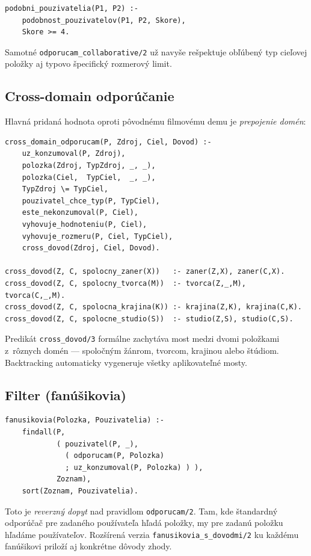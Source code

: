 \documentclass[11pt,a4paper]{article}
\begin{document}
\begin{lstlisting}
podobni_pouzivatelia(P1, P2) :-
    podobnost_pouzivatelov(P1, P2, Skore),
    Skore >= 4.
\end{lstlisting}

\noindent
Samotné \texttt{odporucam\_collaborative/2} už navyše rešpektuje
obľúbený typ cieľovej položky aj typovo špecifický rozmerový limit.

\subsection{Cross-domain odporúčanie}

Hlavná pridaná hodnota oproti pôvodnému filmovému demu je
\emph{prepojenie domén}:

\begin{lstlisting}
cross_domain_odporucam(P, Zdroj, Ciel, Dovod) :-
    uz_konzumoval(P, Zdroj),
    polozka(Zdroj, TypZdroj, _, _),
    polozka(Ciel,  TypCiel,  _, _),
    TypZdroj \= TypCiel,
    pouzivatel_chce_typ(P, TypCiel),
    este_nekonzumoval(P, Ciel),
    vyhovuje_hodnoteniu(P, Ciel),
    vyhovuje_rozmeru(P, Ciel, TypCiel),
    cross_dovod(Zdroj, Ciel, Dovod).

cross_dovod(Z, C, spolocny_zaner(X))   :- zaner(Z,X), zaner(C,X).
cross_dovod(Z, C, spolocny_tvorca(M))  :- tvorca(Z,_,M), tvorca(C,_,M).
cross_dovod(Z, C, spolocna_krajina(K)) :- krajina(Z,K), krajina(C,K).
cross_dovod(Z, C, spolocne_studio(S))  :- studio(Z,S), studio(C,S).
\end{lstlisting}

\noindent
Predikát \texttt{cross\_dovod/3} formálne zachytáva most medzi
dvomi položkami z~rôznych domén --- spoločným žánrom, tvorcom,
krajinou alebo štúdiom. Backtracking automaticky vygeneruje
všetky aplikovateľné mosty.

\subsection{Filter  (fanúšikovia)}

\begin{lstlisting}
fanusikovia(Polozka, Pouzivatelia) :-
    findall(P,
            ( pouzivatel(P, _),
              ( odporucam(P, Polozka)
              ; uz_konzumoval(P, Polozka) ) ),
            Zoznam),
    sort(Zoznam, Pouzivatelia).
\end{lstlisting}

\noindent
Toto je \emph{reverzný dopyt} nad pravidlom \texttt{odporucam/2}.
Tam, kde štandardný odporúčač pre zadaného používateľa hľadá
položky, my pre zadanú položku hľadáme používateľov.
Rozšírená verzia \texttt{fanusikovia\_s\_dovodmi/2} ku každému
fanúšikovi priloží aj konkrétne dôvody zhody.
\end{document}
